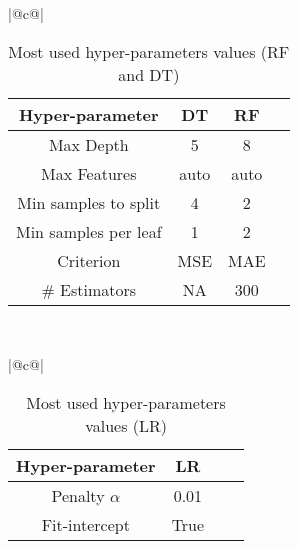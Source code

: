 \begin{table}[t]
\centering
\caption{Most used hyper-parameters values (RF and DT)}\label{tab:hyper-parameters}

\centering

\begin{tabular}{|@{}c@{}|}
\hline

    \begin{tabular}{c|c|c|c}
        \textbf{Hyper-parameter} & \textbf{DT} & \textbf{RF}   \\ \hline
        Max Depth &  5 & 8  \\
        Max Features & auto & auto  \\
        Min samples to split & 4 & 2  \\
        Min samples per leaf & 1 & 2  \\
        Criterion & MSE & MAE  \\
        \# Estimators & NA & 300  
    \end{tabular}

    \\ \hline
    
\end{tabular}



\end{table}

\begin{table}[t]
\centering
\caption{Most used hyper-parameters values (LR)}\label{tab:hyper-parameters-lr}

\centering



\begin{tabular}{|@{}c@{}|}
\hline

    \begin{tabular}{c|c|c|c}
        \textbf{Hyper-parameter} & \textbf{LR}  \\ \hline
         Penalty $\alpha$ &  0.01\\
        Fit-intercept &  True
    \end{tabular}

    \\ \hline
    
\end{tabular}

\end{table}